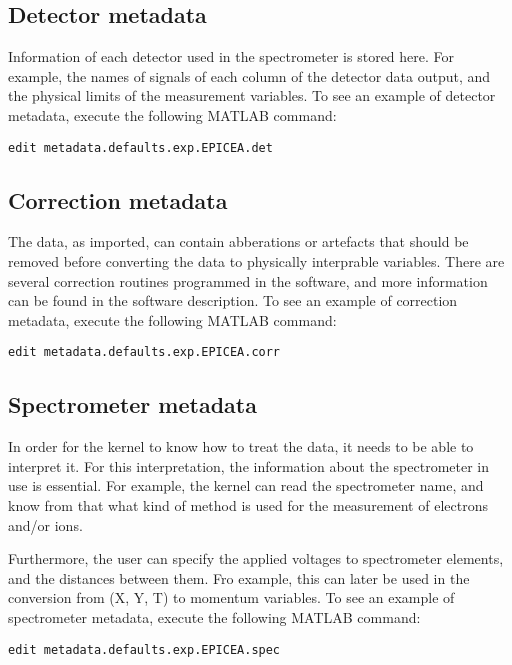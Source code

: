 \subsection{Detector metadata}
Information of each detector used in the spectrometer is stored here. For example, the names of signals of each column of the detector data output, and the physical limits of the measurement variables. To see an example of detector metadata, execute the following MATLAB command:
\lstset{language=MATLAB}
\begin{lstlisting}
edit metadata.defaults.exp.EPICEA.det
\end{lstlisting}

\subsection{Correction metadata}
The data, as imported, can contain abberations or artefacts that should be removed before converting the data to physically interprable variables. There are several correction routines programmed in the software, and more information can be found in the software description. To see an example of correction metadata, execute the following MATLAB command:
\lstset{language=MATLAB}
\begin{lstlisting}
edit metadata.defaults.exp.EPICEA.corr
\end{lstlisting}

\subsection{Spectrometer metadata}
In order for the kernel to know how to treat the data, it needs to be able to interpret it. For this interpretation, the information about the spectrometer in use is essential. For example, the kernel can read the spectrometer name, and know from that what kind of method is used for the measurement of electrons and/or ions. 

Furthermore, the user can specify the applied voltages to spectrometer elements, and the distances between them. Fro example, this can later be used in the conversion from (X, Y, T) to momentum variables. To see an example of spectrometer metadata, execute the following MATLAB command:
\lstset{language=MATLAB}
\begin{lstlisting}
edit metadata.defaults.exp.EPICEA.spec
\end{lstlisting}

